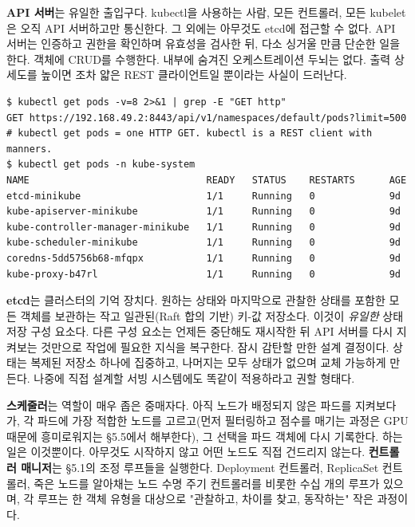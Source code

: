 \textbf{API 서버}는 유일한 출입구다. kubectl을 사용하는 사람, 모든 컨트롤러, 모든 kubelet은 오직 API 서버하고만 통신한다. 그 외에는 아무것도 etcd에 접근할 수 없다. API 서버는 인증하고 권한을 확인하며 유효성을 검사한 뒤, 다소 싱거울 만큼 단순한 일을 한다. 객체에 CRUD를 수행한다. 내부에 숨겨진 오케스트레이션 두뇌는 없다. 출력 상세도를 높이면 조차 얇은 REST 클라이언트일 뿐이라는 사실이 드러난다.

\begin{terminalbox}
\begin{Verbatim}[breaklines=true,breakanywhere=true,fontsize=\small,formatcom=\color{tbbtermfg},codes=\tbbcodeactive]
$ kubectl get pods -v=8 2>&1 | grep -E "GET http"
GET https://192.168.49.2:8443/api/v1/namespaces/default/pods?limit=500
# kubectl get pods = one HTTP GET. kubectl is a REST client with manners.
$ kubectl get pods -n kube-system
NAME                               READY   STATUS    RESTARTS      AGE
etcd-minikube                      1/1     Running   0             9d
kube-apiserver-minikube            1/1     Running   0             9d
kube-controller-manager-minikube   1/1     Running   0             9d
kube-scheduler-minikube            1/1     Running   0             9d
coredns-5dd5756b68-mfqpx           1/1     Running   0             9d
kube-proxy-b47rl                   1/1     Running   0             9d
\end{Verbatim}
\end{terminalbox}

\textbf{etcd}는 클러스터의 기억 장치다. 원하는 상태와 마지막으로 관찰한 상태를 포함한 모든 객체를 보관하는 작고 일관된(Raft 합의 기반) 키-값 저장소다. 이것이 \textit{유일한} 상태 저장 구성 요소다. 다른 구성 요소는 언제든 중단해도 재시작한 뒤 API 서버를 다시 지켜보는 것만으로 작업에 필요한 지식을 복구한다. 잠시 감탄할 만한 설계 결정이다. 상태는 복제된 저장소 하나에 집중하고, 나머지는 모두 상태가 없으며 교체 가능하게 만든다. 나중에 직접 설계할 서빙 시스템에도 똑같이 적용하라고 권할 형태다.

\textbf{스케줄러}는 역할이 매우 좁은 중매자다. 아직 노드가 배정되지 않은 파드를 지켜보다가, 각 파드에 가장 적합한 노드를 고르고(먼저 필터링하고 점수를 매기는 과정은 GPU 때문에 흥미로워지는 §5.5에서 해부한다), 그 선택을 파드 객체에 다시 기록한다. 하는 일은 이것뿐이다. 아무것도 시작하지 않고 어떤 노드도 직접 건드리지 않는다. \textbf{컨트롤러 매니저}는 §5.1의 조정 루프들을 실행한다. Deployment 컨트롤러, ReplicaSet 컨트롤러, 죽은 노드를 알아채는 노드 수명 주기 컨트롤러를 비롯한 수십 개의 루프가 있으며, 각 루프는 한 객체 유형을 대상으로 "관찰하고, 차이를 찾고, 동작하는" 작은 과정이다.

